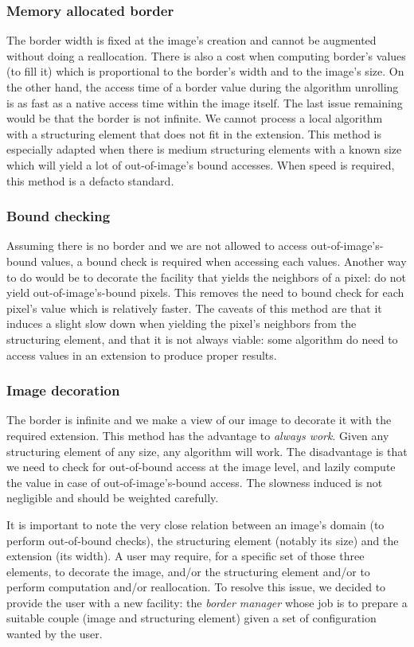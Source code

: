 \subsubsection{Memory allocated border}
The border width is fixed at the image's creation and cannot be augmented without doing a reallocation. There is also a
cost when computing border's values (to fill it) which is proportional to the border's width and to the image's size. On
the other hand, the access time of a border value during the algorithm unrolling is as fast as a native access time
within the image itself. The last issue remaining would be that the border is not infinite. We cannot process a local
algorithm with a structuring element that does not fit in the extension. This method is especially adapted when there is
medium structuring elements with a known size which will yield a lot of out-of-image's bound accesses. When speed is
required, this method is a defacto standard.

\subsubsection{Bound checking}
Assuming there is no border and we are not allowed to access out-of-image's-bound values, a bound check is required when
accessing each values. Another way to do would be to decorate the facility that yields the neighbors of a pixel: do not
yield out-of-image's-bound pixels. This removes the need to bound check for each pixel's value which is relatively
faster. The caveats of this method are that it induces a slight slow down when yielding the pixel's neighbors from the
structuring element, and that it is not always viable: some algorithm do need to access values in an extension to
produce proper results.

\subsubsection{Image decoration}
The border is infinite and we make a view of our image to decorate it with the required extension. This method has the
advantage to \textit{always work}. Given any structuring element of any size, any algorithm will work. The disadvantage
is that we need to check for out-of-bound access at the image level, and lazily compute the value in case of
out-of-image's-bound access. The slowness induced is not negligible and should be weighted carefully.

\bigskip

It is important to note the very close relation between an image's domain (to perform out-of-bound checks), the
structuring element (notably its size) and the extension (its width). A user may require, for a specific set of those
three elements, to decorate the image, and/or the structuring element and/or to perform computation and/or reallocation.
To resolve this issue, we decided to provide the user with a new facility: the \textit{border manager} whose job is to
prepare a suitable couple (image and structuring element) given a set of configuration wanted by the user.

